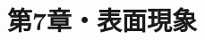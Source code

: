 \documentclass{ltjsarticle}
\title{第7章・表面現象}
\date{\DTMnow}
\begin{document}
\maketitle



\hypertarget{targetofBackToTheToc}{}
\tableofcontents

\setcounter{section}{60}





\end{document}
